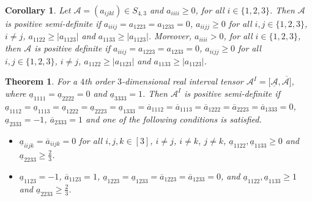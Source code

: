 \documentclass[twoside]{article}
\newtheorem{theorem}{Theorem}[section]
\newtheorem{corollary}{Corollary}[section]
\begin{document}
\begin{corollary}\label{cor2}
Let ${\mathcal{A}}=(a_{ijkl})\in S_{4,3}$ and $a_{iiii}\geq0$, for all $i\in\{1,2,3\}$. Then $\mathcal{A}$ is positive semi-definite if $a_{iiij}=a_{1223}=a_{1233}=0$, $a_{iijj}\geq0$ for all $i,j\in\{1,2,3\}$, $i\neq j$, $a_{1122}\geq |a_{1123}|$ and $a_{1133}\geq |a_{1123}|$. Moreover, $a_{iiii}>0$, for all $i\in\{1,2,3\}$, then $\mathcal{A}$ is positive definite if $a_{iiij}=a_{1223}=a_{1233}=0$, $a_{iijj}\geq0$ for all $i,j\in\{1,2,3\}$, $i\neq j$, $a_{1122}\geq |a_{1123}|$ and $a_{1133}\geq |a_{1123}|$.
\end{corollary}




\begin{theorem}\label{th3.2}
For a $4$th order $3$-dimensional real interval tensor ${\mathcal{A}}^I=[\underline{\mathcal{A}},\overline{\mathcal{A}]}$, where  $\underline{a}_{1111}=\underline{a}_{2222}=0$ and $\underline{a}_{3333}=1$. Then ${\mathcal{A}}^I$ is positive semi-definite if $\underline{a}_{1112}=\underline{a}_{1113}=\underline{a}_{1222}=\underline{a}_{2223}=\underline{a}_{1333}=\overline{a}_{1112}=\overline{a}_{1113}=\overline{a}_{1222}=\overline{a}_{2223}=\overline{a}_{1333}=0$, $\underline{a}_{2333}=-1$, $\overline{a}_{2333}=1$ and one of the following conditions is satisfied.
\begin{itemize}
  \item [(a)]  $\underline{a}_{iijk}=\overline{a}_{iijk}=0$ for all $i,j,k\in[3]$, $i\neq j$, $i\neq k$, $j\neq k$, $\underline{a}_{1122},\underline{a}_{1133}\geq0$ and $\underline{a}_{2233}\geq\frac{2}{3}$.
  \item [(b)] $\underline{a}_{1123}=-1$, $\overline{a}_{1123}=1$, $\underline{a}_{1223}=\underline{a}_{1233}=\overline{a}_{1223}=\overline{a}_{1233}=0$, and $\underline{a}_{1122},\underline{a}_{1133}\geq1$ and $\underline{a}_{2233}\geq\frac{2}{3}$.
\end{itemize}
\end{theorem}
\end{document}
